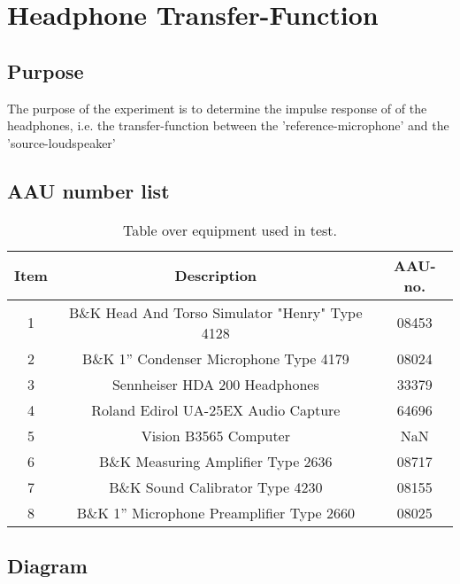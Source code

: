 \section{Headphone Transfer-Function} \label{sec:HPjournal}
\subsection{Purpose}
The purpose of the experiment is to determine the impulse response of of the  headphones, i.e. the transfer-function between the 'reference-microphone' and the 'source-loudspeaker'

\subsection{AAU number list}
\begin{table}[H]
	\centering
	\begin{tabular}{ c c c } \toprule
		{Item}	& {Description} 						& {AAU-no}. \\ \bottomrule 
		1	&	B\&K Head And Torso Simulator "Henry" Type 4128	& 08453		\\
		2	&	B\&K 1'' Condenser Microphone Type 4179 & 08024\\
		3	&	Sennheiser HDA 200	Headphones			& 33379		\\
		4	&	Roland Edirol UA-25EX Audio Capture		& 64696		\\
		5	&	Vision B3565 Computer					& NaN		\\
		6	&	B\&K Measuring Amplifier Type 2636	& 08717		\\
		7	&	B\&K Sound Calibrator Type 4230			& 08155		\\ 
		8	&	B\&K 1'' Microphone Preamplifier Type 2660	& 08025		\\
		\bottomrule
	\end{tabular}
	\caption{Table over equipment used in test.}
	\label{tab:UsedEquipmentListningHP}
\end{table}

\subsection{Diagram}


